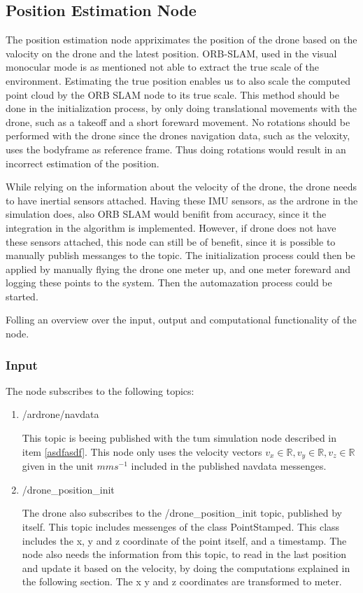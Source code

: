 	
	\subsection{Position Estimation Node}
	
	The position estimation node appriximates the position of the drone based on the valocity on the drone and the latest position. ORB-SLAM, used 
	in the visual monocular mode is as mentioned not able to extract the true scale of the environment. Estimating the true position enables us 
	to also scale the computed point cloud by the ORB SLAM node to its true scale. This method should be done in the initialization process, by 
	only doing translational movements with the drone, such as a takeoff and a short foreward movement. No rotations should be performed with the drone 
	since the drones navigation data, such as the veloxity, uses the bodyframe as reference frame. Thus doing rotations would result in an incorrect 
	estimation of the position. 
	
	While relying on the information about the 
	velocity of the drone, the drone needs to have inertial sensors attached. Having these IMU sensors, as the ardrone in the simulation does, also ORB SLAM would benifit from 
	accuracy, since it the integration in the algorithm is implemented. However, if drone does not have these sensors attached, 
	this node can still be of benefit, since it is possible to manually publish messanges to the topic. The initialization process could then be applied 
	by manually flying the drone one meter up, and one meter foreward and logging these points to the system. Then the automazation process could be started.
	
	
	Folling an overview over the input, output and computational functionality of the node. 
	
	\subsubsection{Input}
	
	The node subscribes to the following topics:
	
	\begin{enumerate}
	\item{/ardrone/navdata}
	
	This topic is beeing published with the tum simulation node described in item \ref{asdfasdf}.
	This node only uses the velocity vectors
	$v_x \in \mathbb{R}, v_y \in \mathbb{R}, v_z \in \mathbb{R}$ given in the unit $mms^{-1}$ included in the published navdata messenges. 
	
	\item{/drone\_position\_init}
	
	The drone also subscribes to the /drone\_position\_init topic, published by itself. This topic includes messenges of the class PointStamped. 
	This class includes the x, y and z coordinate of the point itself, and a timestamp.  
	The node also needs the information from this topic, 
	to read in the last position and update it based on the velocity, by doing the computations explained in the following section. The x y and z 
	coordinates are transformed to meter. 
	\end{enumerate}
	
